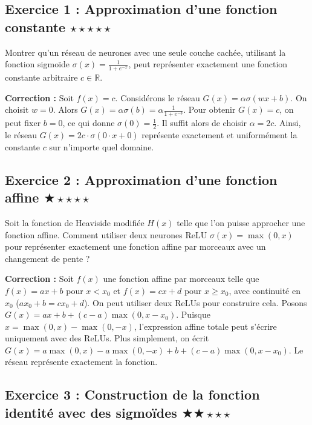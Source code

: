 \documentclass[11pt,a4paper]{article}
\begin{document}
\subsection*{Exercice 1 : Approximation d'une fonction constante \quad $\star\star\star\star\star$}

Montrer qu'un réseau de neurones avec une seule couche cachée, utilisant la fonction sigmoïde $\sigma(x) = \frac{1}{1 + e^{-x}}$, peut représenter exactement une fonction constante arbitraire $c \in \mathbb{R}$.

\textbf{Correction :}
Soit $f(x) = c$. Considérons le réseau $G(x) = \alpha \sigma(w x + b)$.
On choisit $w = 0$. Alors $G(x) = \alpha \sigma(b) = \alpha \frac{1}{1 + e^{-b}}$.
Pour obtenir $G(x) = c$, on peut fixer $b = 0$, ce qui donne $\sigma(0) = \frac{1}{2}$.
Il suffit alors de choisir $\alpha = 2c$.
Ainsi, le réseau $G(x) = 2c \cdot \sigma(0 \cdot x + 0)$ représente exactement et uniformément la constante $c$ sur n'importe quel domaine.


\vspace{1cm}
\subsection*{Exercice 2 : Approximation d'une fonction affine \quad $\bigstar\star\star\star\star$}

Soit la fonction de Heaviside modifiée $H(x)$ telle que l'on puisse approcher une fonction affine. Comment utiliser deux neurones ReLU $\sigma(x) = \max(0, x)$ pour représenter exactement une fonction affine par morceaux avec un changement de pente ?

\textbf{Correction :}
Soit $f(x)$ une fonction affine par morceaux telle que $f(x) = a x + b$ pour $x < x_0$ et $f(x) = c x + d$ pour $x \ge x_0$, avec continuité en $x_0$ ($a x_0 + b = c x_0 + d$).
On peut utiliser deux ReLUs pour construire cela.
Posons $G(x) = a x + b + (c-a) \max(0, x - x_0)$.
Puisque $x = \max(0, x) - \max(0, -x)$, l'expression affine totale peut s'écrire uniquement avec des ReLUs.
Plus simplement, on écrit $G(x) = a \max(0, x) - a \max(0, -x) + b + (c-a) \max(0, x - x_0)$.
Le réseau représente exactement la fonction.


\vspace{1cm}
\subsection*{Exercice 3 : Construction de la fonction identité avec des sigmoïdes \quad $\bigstar\bigstar\star\star\star$}
\end{document}
